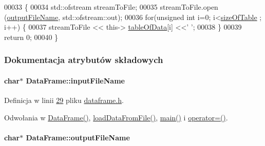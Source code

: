 \begin{DoxyCode}
00033 \{
00034         std::ofstream streamToFile;
00035         streamToFile.open (\hyperlink{class_data_frame_a824a73f019aec71281837abafd95a510}{outputFileName}, std::ofstream::out);
00036         \textcolor{keywordflow}{for}(\textcolor{keywordtype}{unsigned} \textcolor{keywordtype}{int} i=0; i<\hyperlink{class_data_frame_aa5d1905c6910cad07ab5189bd34b13ab}{sizeOfTable} ; i++) \{
00037                 streamToFile << this-> \hyperlink{class_data_frame_a8edc4ce524483e2e5069067267ccdcbf}{tableOfData}[i] <<\textcolor{charliteral}{' '};
00038         \}
00039         \textcolor{keywordflow}{return} 0;
00040 \}
\end{DoxyCode}


\subsubsection{Dokumentacja atrybutów składowych}
\hypertarget{class_data_frame_a90041bfdf474b0d7ce39bc3dbbb55aa9}{
\paragraph[{input\-File\-Name}]{\setlength{\rightskip}{0pt plus 5cm}char$\ast$ Data\-Frame\-::input\-File\-Name}}\label{class_data_frame_a90041bfdf474b0d7ce39bc3dbbb55aa9}


Definicja w linii \hyperlink{dataframe_8h_source_l00029}{29} pliku \hyperlink{dataframe_8h_source}{dataframe.\-h}.



Odwołania w \hyperlink{dataframe_8cpp_source_l00012}{Data\-Frame()}, \hyperlink{dataframe_8cpp_source_l00020}{load\-Data\-From\-File()}, \hyperlink{main_8cpp_source_l00017}{main()} i \hyperlink{dataframe_8cpp_source_l00044}{operator=()}.

\hypertarget{class_data_frame_a824a73f019aec71281837abafd95a510}{
\paragraph[{output\-File\-Name}]{\setlength{\rightskip}{0pt plus 5cm}char$\ast$ Data\-Frame\-::output\-File\-Name}}\label{class_data_frame_a824a73f019aec71281837abafd95a510}


